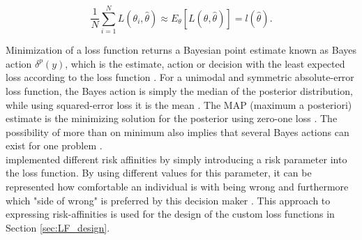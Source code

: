         \begin{equation}\label{eq:ExpectedLoss2}
        \frac{1}{N}\sum_{i=1}^{N} L(\theta_i,\hat{\theta}) \approx E_{\theta}[L(\theta,\hat{\theta})] = l(\hat{\theta}).
        \end{equation}
        
        Minimization of a loss function returns a Bayesian point estimate known as Bayes action $\delta^p(y)$, which is the estimate, action or decision with the least expected loss according to the loss function \citep{berger2013stat}. For a unimodal and symmetric absolute-error loss function, the Bayes action is simply the median of the posterior distribution, while using squared-error loss it is the mean \citep{davidson2015, berger2013stat}. The MAP (maximum a posteriori) estimate is the minimizing solution for the posterior using zero-one loss \citep{davidson2015}. The possibility of more than on minimum also implies that several Bayes actions can exist for one problem \citep{berger2013stat}.\\
        \citet{davidson2015} implemented different risk affinities by simply  introducing a risk parameter into the loss function. By using different values for this parameter, it can be represented how comfortable an individual is with being wrong and furthermore which "side of wrong" is preferred by this decision maker \citep{davidson2015}. This approach to expressing risk-affinities is used for the design of the custom loss functions in Section \ref{sec:LF_design}.
        
        
